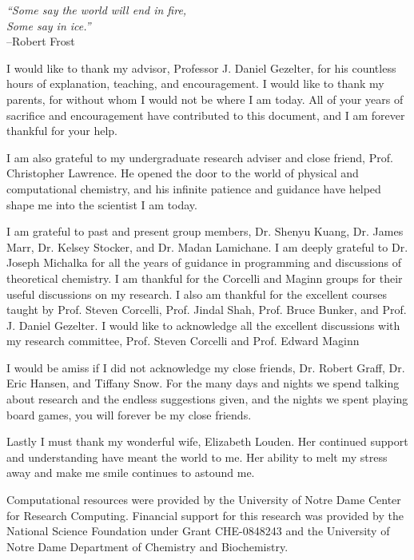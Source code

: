 \documentclass[noinfo,final,sort&compress]{nddiss2e}
\begin{document}
\tableofcontents
\listoffigures
\listoftables

\begin{preface}
\vfill
\begin{flushright}
\textit{``Some say the world will end in fire,} \\
\textit{Some say in ice.''}\\
--Robert Frost
\end{flushright}
\vfill
\end{preface}

\begin{acknowledge}
  I would like to thank my advisor, Professor J. Daniel Gezelter, for
  his countless hours of explanation, teaching, and encouragement. I
  would like to thank my parents, for without whom I would not be
  where I am today. All of your years of sacrifice and encouragement
  have contributed to this document, and I am forever thankful for
  your help.

  I am also grateful to my undergraduate research adviser and close
  friend, Prof. Christopher Lawrence. He opened the door to the world
  of physical and computational chemistry, and his infinite
  patience and guidance have helped shape me into the scientist I am
  today. 

  I am grateful to past and present group members, Dr. Shenyu Kuang,
  Dr. James Marr, Dr. Kelsey Stocker, and Dr. Madan Lamichane. I am
  deeply grateful to Dr. Joseph Michalka for all the years of guidance
  in programming and discussions of theoretical chemistry. I am
  thankful for the Corcelli and Maginn groups for their useful
  discussions on my research. I also am thankful for the excellent
  courses taught by Prof. Steven Corcelli, Prof. Jindal Shah,
  Prof. Bruce Bunker, and Prof. J. Daniel Gezelter.  I would like to
  acknowledge all the excellent discussions with my research
  committee, Prof. Steven Corcelli and Prof. Edward Maginn

  I would be amiss if I did not acknowledge my close friends,
  Dr. Robert Graff, Dr. Eric Hansen, and Tiffany Snow. For the many
  days and nights we spend talking about research and the endless
  suggestions given, and the nights we spent playing board games, you
  will forever be my close friends.

  Lastly I must thank my wonderful wife, Elizabeth Louden. Her
  continued support and understanding have meant the world to me. Her
  ability to melt my stress away and make me smile continues to
  astound me.

  Computational resources were provided by the University of Notre
  Dame Center for Research Computing. Financial support for this
  research was provided by the National Science Foundation under Grant
  CHE-0848243 and the University of Notre Dame Department of Chemistry
  and Biochemistry.
\end{acknowledge}
\end{document}
